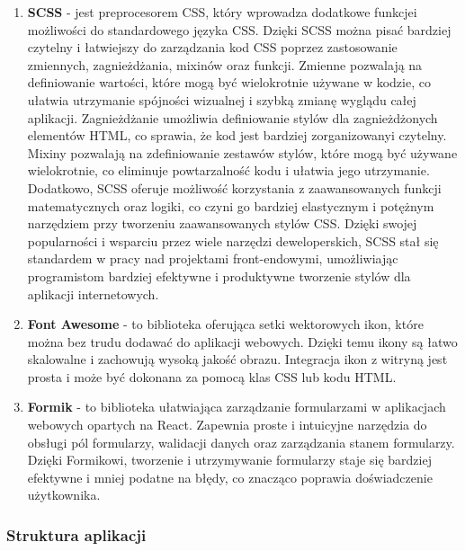 \begin{enumerate}
    \item {\bf SCSS} - jest preprocesorem CSS, który wprowadza dodatkowe funkcje\linebreak i możliwości do standardowego języka CSS. Dzięki SCSS można pisać bardziej czytelny i łatwiejszy do zarządzania kod CSS poprzez zastosowanie zmiennych, zagnieżdżania, mixinów oraz funkcji. Zmienne pozwalają na definiowanie wartości, które mogą być wielokrotnie używane w kodzie, co ułatwia utrzymanie spójności wizualnej i szybką zmianę wyglądu całej aplikacji. Zagnieżdżanie umożliwia definiowanie stylów dla zagnieżdżonych elementów HTML, co sprawia, że kod jest bardziej zorganizowany\linebreak i czytelny. Mixiny pozwalają na zdefiniowanie zestawów stylów, które mogą być używane wielokrotnie, co eliminuje powtarzalność kodu i ułatwia jego utrzymanie. Dodatkowo, SCSS oferuje możliwość korzystania z zaawansowanych funkcji matematycznych oraz logiki, co czyni go bardziej elastycznym i potężnym narzędziem przy tworzeniu zaawansowanych stylów CSS. Dzięki swojej popularności i wsparciu przez wiele narzędzi deweloperskich, SCSS stał się standardem w pracy nad projektami front-endowymi, umożliwiając programistom bardziej efektywne i produktywne tworzenie stylów dla aplikacji internetowych.
    
    \item {\bf Font Awesome} - to biblioteka oferująca setki wektorowych ikon, które można bez trudu dodawać do aplikacji webowych. Dzięki temu ikony są łatwo skalowalne i zachowują wysoką jakość obrazu. Integracja ikon \linebreak z witryną jest prosta i może być dokonana za pomocą klas CSS lub kodu HTML.
    
    \item {\bf Formik} - to biblioteka ułatwiająca zarządzanie formularzami w aplikacjach webowych opartych na React. Zapewnia proste i intuicyjne narzędzia do obsługi pól formularzy, walidacji danych oraz zarządzania stanem formularzy. Dzięki Formikowi, tworzenie i utrzymywanie formularzy staje się bardziej efektywne i mniej podatne na błędy, co znacząco poprawia doświadczenie użytkownika.

\end{enumerate}

\clearpage

\subsubsection{Struktura aplikacji}


